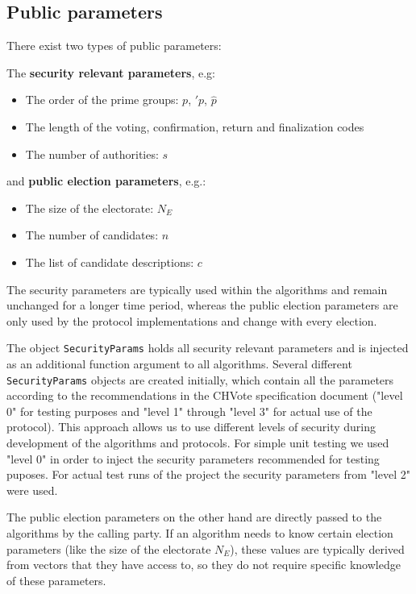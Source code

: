 \subsection{Public parameters}
There exist two types of public parameters:

The \textbf{security relevant parameters}, e.g:

\begin{itemize}
	\item The order of the prime groups: $p$, $\prime{p}$, $\hat{p}$
	\item The length of the voting, confirmation, return and finalization codes
	\item The number of authorities: $s$
\end{itemize}

and \textbf{public election parameters}, e.g.:

\begin{itemize}
	\item The size of the electorate: $N_E$
	\item The number of candidates: $n$
	\item The list of candidate descriptions: $c$
\end{itemize}

The security parameters are typically used within the algorithms and remain unchanged for a longer time period, whereas the public election parameters are only used by the protocol implementations and change with every election.

The object \texttt{SecurityParams} holds all security relevant parameters and is injected as an additional function argument to all algorithms. Several different \texttt{SecurityParams} objects are created initially, which contain all the parameters according to the recommendations in the CHVote specification document ("level 0" for testing purposes and "level 1" through "level 3" for actual use of the protocol). This approach allows us to use different levels of security during development of the algorithms and protocols. For simple unit testing we used "level 0" in order to inject the security parameters recommended for testing puposes. For actual test runs of the project the security parameters from "level 2" were used.

The public election parameters on the other hand are directly passed to the algorithms by the calling party. If an algorithm needs to know certain election parameters (like the size of the electorate $N_E$), these values are typically derived from vectors that they have access to, so they do not require specific knowledge of these parameters.

